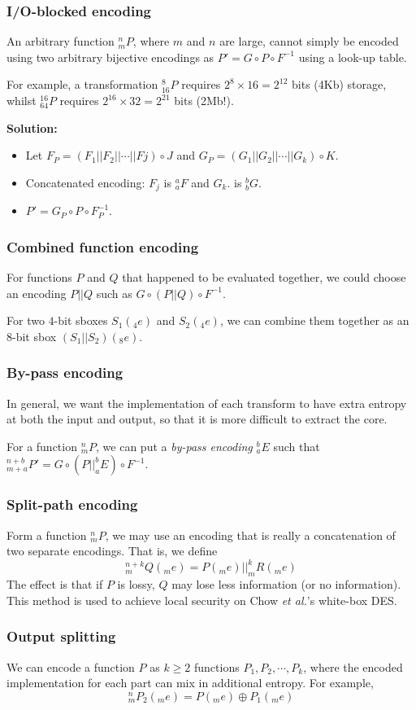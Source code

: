 \documentclass{beamer}
\begin{document}
\frame
{
\frametitle{I/O-blocked encoding}
An arbitrary function $^{n}_{m}P$, where $m$ and $n$ are large, cannot simply be encoded using two arbitrary bijective encodings as $P'=G\circ P \circ F^{-1}$ using a look-up table. \newline

For example, a transformation $^{8}_{16}P$ requires $2^{8}\times 16=2^{12}$ bits (4Kb) storage, whilst $^{16}_{64}P$ requires $2^{16} \times 32=2^{21}$ bits (2Mb!).\newline

\textbf{Solution:}
\begin{itemize}
\item Let $F_{P} = (F_{1}||F_{2}||\cdots||F{j}) \circ J$ and $G_{P}=(G_{1}||G_{2}||\cdots||G_{k})\circ K$.
\item Concatenated encoding: $F_{j}$ is $^{a}_{a}F$ and $G_{k}$. is $^{b}_{b}G$.
\item $P'=G_{P}\circ P \circ F_{P}^{-1}$.
\end{itemize}
}

\frame
{
\frametitle{Combined function encoding}
For functions $P$ and $Q$ that happened to be evaluated  together, we could choose an encoding $P||Q$ such as $G\circ (P||Q) \circ F^{-1}$.\newline

For two $4$-bit sboxes $S_{1}(_{4}e)$ and $S_{2}(_{4}e)$, we can combine them together as an $8$-bit sbox $(S_{1}||S_{2})(_{8}e)$.

}

\frame
{
\frametitle{By-pass encoding}
In general, we want the implementation of each transform to have extra entropy at both the input and output, so that it is more difficult to extract the core.\newline

For a function $^{n}_{m}P$, we can put a \textit{by-pass encoding} $^{b}_{a}E$ such that $^{n+b}_{m+a}P'=G\circ (P||^{b}_{a}E)\circ F^{-1}$.
}

\frame
{
\frametitle{Split-path encoding}
Form a function $^{n}_{m}P$, we may use an encoding that is \textcolor[rgb]{1.00,0.00,0.00}{really a concatenation of two separate encodings}. That is, we define
\[^{n+k}_{m}Q(_{m}e)=P(_{m}e)||^{k}_{m}R(_{m}e)\]
The effect is that if $P$ is lossy, $Q$ may lose less information (or no information). This method is used to achieve \textcolor[rgb]{1.00,0.00,0.00}{local security} on Chow \textit{et al.}'s white-box DES.
}

\frame
{
\frametitle{Output splitting}
We can encode a function $P$ as $k \geq 2$ functions $P_{1}, P_{2}, \cdots, P_{k}$, where the encoded implementation for each part can mix in additional entropy. For example, \[^{n}_{m}P_{2}(_{m}e) =P(_{m}e) \oplus P_{1}(_{m}e)\]

}
\end{document}
